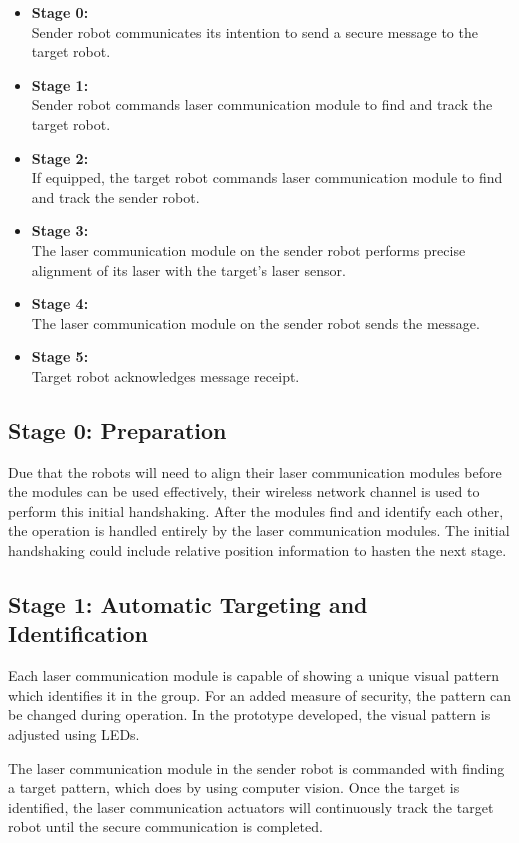 \documentclass[botnum, fleqn]{unmeethesis}
\begin{document}
\begin{itemize}
 \item \textbf{Stage 0:}\\ Sender robot communicates its intention to send a secure message to the target robot.
 \item \textbf{Stage 1:}\\ Sender robot commands laser communication module to find and track the target robot.
 \item \textbf{Stage 2:}\\ If equipped, the target robot commands laser communication module to find and track the sender robot.
 \item \textbf{Stage 3:}\\ The laser communication module on the sender robot performs precise alignment of its laser with the target's laser sensor.
 \item \textbf{Stage 4:}\\ The laser communication module on the sender robot sends the message.
 \item \textbf{Stage 5:}\\ Target robot acknowledges message receipt.
\end{itemize}

\subsection*{Stage 0: Preparation}

Due that the robots will need to align their laser communication modules before the modules can be used effectively, their wireless network channel is used to perform this initial handshaking. After the modules find and identify each other, the operation is handled entirely by the laser communication modules. The initial handshaking could include relative position information to hasten the next stage.

\subsection*{Stage 1: Automatic Targeting and Identification}

Each laser communication module is capable of showing a unique visual pattern which identifies it in the group. For an added measure of security, the pattern can be changed during operation. In the prototype developed, the visual pattern is adjusted using LEDs.

The laser communication module in the sender robot is commanded with finding a target pattern, which does by using computer vision. Once the target is identified, the laser communication actuators will continuously track the target robot until the secure communication is completed. 
\end{document}
